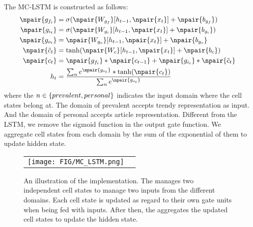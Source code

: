 
The MC-LSTM is constructed as follows:
\begin{align*}
	\npair{g_{f_t}} &= \sigma(\npair{W_{g_f}}[h_{t-1},\npair{x_t}]+\npair{b_{g_f}}) \\
	\npair{g_{i_t}} &= \sigma(\npair{W_{g_i}}[h_{t-1},\npair{x_t}]+\npair{b_{g_i}}) \\
	\npair{g_{o_t}} &= \npair{W_{g_o}}[h_{t-1},\npair{x_t}]+\npair{b_{g_o}} \\
	\npair{\tilde{c}_t} &= \tanh(\npair{W_c}[h_{t-1},\npair{x_t}]+\npair{b_c}) \\
	\npair{c_t} &= \npair{g_{f_t}} * \npair{c_{t-1}} + \npair{g_{i_t}} * \npair{\tilde{c}_t} \\
	h_t &= \frac{\sum_{n}{e^{\npair{g_{o_t}}}*\tanh(\npair{c_t})}}{\sum_{n}{e^{\npair{g_{o_t}}}}}
\end{align*}
where the $n \in \{prevalent,\space personal\}$ indicates the input domain where the cell states belong at.
The domain of prevalent accepts trendy representation as input.
And the domain of personal accepts article representation. 
Different from the LSTM, we remove the sigmoid function in the output gate function.
We aggregate cell states from each domain by the sum of the exponential of them to update hidden state.

\begin{figure}[h]
\begin{center}
\begin{tabular}{cc}
     \texttt{[image: FIG/MC\_LSTM.png]} \\
\end{tabular}
\caption{An illustration of the \method implementation.
	The \method manages two independent cell states to manage two inputs from the different domains.
	Each cell state is updated as regard to their own gate units when being fed with inputs.
	After then, the \method aggregates the updated cell states to update the hidden state.
}
\label{fig:mclstm}
\end{center}
\end{figure}

